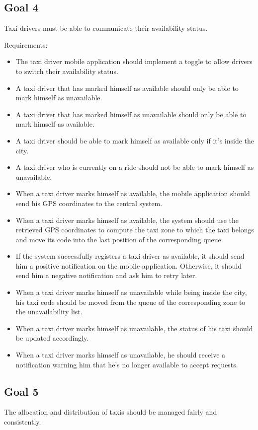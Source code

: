 \subsection{Goal 4}
Taxi drivers must be able to communicate their availability status.

Requirements:
\begin{itemize}
\item The taxi driver mobile application should implement a toggle to allow drivers to switch their availability status.
\item A taxi driver that has marked himself as available should only be able to mark himself as unavailable. 
\item A taxi driver that has marked himself as unavailable should only be able to mark himself as available.
\item A taxi driver should be able to mark himself as available only if it's inside the city.
\item A taxi driver who is currently on a ride should not be able to mark himself as unavailable.
\item When a taxi driver marks himself as available, the mobile application should send his GPS coordinates to the central system.
\item When a taxi driver marks himself as available, the system should use the retrieved GPS coordinates to compute the taxi zone to which the taxi belongs and move its code into the last position of the corresponding queue.
\item If the system successfully registers a taxi driver as available, it should send him a positive notification on the mobile application. Otherwise, it should send him a negative notification and ask him to retry later.
\item When a taxi driver marks himself as unavailable while being inside the city, his taxi code should be moved from the queue of the corresponding zone to the unavailability list.
\item When a taxi driver marks himself as unavailable, the status of his taxi should be updated accordingly. 
\item When a taxi driver marks himself as unavailable, he should receive a notification warning him that he's no longer available to accept requests.
\end{itemize}


\subsection{Goal 5}
The allocation and distribution of taxis should be managed fairly and consistently.

